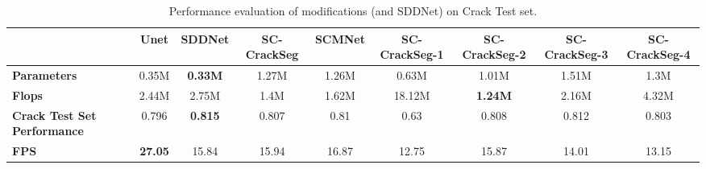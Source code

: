 \documentclass[a4paper,12pt]{report}
\begin{document}
\begin{table}[htbp]
    \begin{adjustbox}{width=\columnwidth,center}
        \begin{tabular}{|p{}|c|c|c|c|c|c|c|c|}
            \hline
                                                & \textbf{Unet} & \textbf{SDDNet} & \textbf{SC-CrackSeg} & \textbf{SCMNet} & \textbf{SC-CrackSeg-1} & \textbf{SC-CrackSeg-2} & \textbf{SC-CrackSeg-3} & \textbf{SC-CrackSeg-4} \\
            \hline
            \textbf{Parameters}                 & 0.35M         & \textbf{0.33M}  & 1.27M                & 1.26M           & 0.63M                  & 1.01M                  & 1.51M                  & 1.3M                   \\
            \hline
            \textbf{Flops}                      & 2.44M         & 2.75M           & 1.4M                 & 1.62M           & 18.12M                 & \textbf{1.24M}         & 2.16M                  & 4.32M                  \\
            \hline
            \textbf{Crack Test Set Performance} & 0.796         & \textbf{0.815}  & 0.807                & 0.81            & 0.63                   & 0.808                  & 0.812                  & 0.803                  \\
            \hline
            \textbf{FPS} & \textbf{27.05}         & 15.84           & 15.94                & 16.87           & 12.75                  & 15.87                  & 14.01                  & 13.15                  \\
            \hline
        \end{tabular}
    \end{adjustbox}
    \caption{Performance evaluation of modifications (and SDDNet) on Crack Test set.}%
\end{table}
\end{document}
